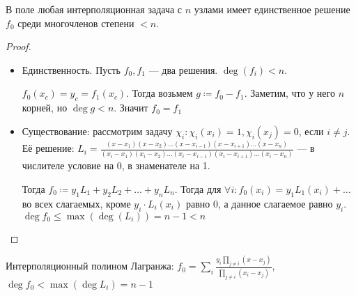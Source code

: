\begin{theorem}
    В поле любая интерполяционная задача с $n$ узлами имеет единственное решение  $f_0$ среди многочленов степени $<n$.
\end{theorem}
\begin{proof}
    \slashn
    \begin{itemize}
    \item Единственность. Пусть $f_0, f_1$ --- два решения.  $\deg(f_i) < n$.  

        $f_0(x_c) = y_c = f_1(x_c)$. Тогда возьмем $g \coloneqq f_0 - f_1$. Заметим, что у него  $n$ корней, но  $\deg g< n$. Значит  $f_0=f_1$
\item Существование: рассмотрим задачу $\chi_i\!: \chi_i(x_i) = 1, \chi_i(x_j) = 0$, если  $i \neq j$. Её решение:  $L_i = \frac{(x-x_1)(x-x_2)\ldots(x - x_{i-1})(x - x_{i+1})\ldots(x - x_n)}{(x_i - x_1)(x_i - x_2)\ldots(x_i - x_{i - 1}) (x_i - x_{i+1}) \ldots (x_i - x_n)}$ --- в числителе условие на 0, в знаменателе на 1.

	Тогда $f_0 \coloneqq y_1 L_1 + y_2 L_2 + \ldots +y_nL_n$. Тогда для $\forall i\!: f_0(x_i) = y_1L_1(x_i) + \ldots$ во всех слагаемых, кроме $y_i \cdot L_i(x_i)$ равно 0, а данное слагаемое равно  $y_i$. $\deg f_0 \le \max(\deg(L_i)) = n - 1 < n$
    \end{itemize}
\end{proof}
\begin{definition}
    Интерполяционный полином Лагранжа: $f_0 = \sum_i \frac{y_i \prod_{j \neq i}(x - x_j)}{\prod_{j \neq i}(x_i - x_j)}$, $\deg f_0 < \max(\deg L_i) = n-1$
\end{definition}

